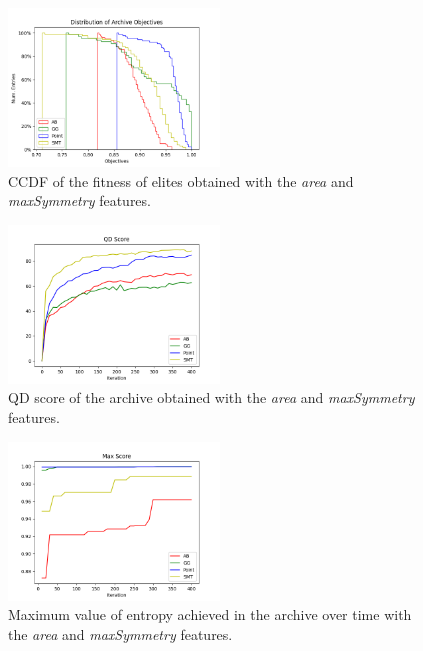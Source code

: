 \vspace*{\fill}
\begin{figure}[hbt!]
    \centering
    \includegraphics[width=0.5\textwidth]{images/Exp1/archive_ccdf.png}
    \caption{CCDF of the fitness of elites obtained with the \textit{area} and \textit{maxSymmetry} features.}
    \label{fig:ccdf_exp1}
\end{figure}


\begin{figure}[H]
    \centering
    \includegraphics[width=0.5\textwidth]{images/Exp1/qd_score.png}
    \caption{QD score of the archive obtained with the \textit{area} and \textit{maxSymmetry} features.}
    \label{fig:qd_score_exp1}
\end{figure}
\vspace*{\fill}


\begin{figure}[H]
    \centering
    \includegraphics[width=0.5\textwidth]{images/Exp1/max_score.png}
    \caption{Maximum value of entropy achieved in the archive over time with the \textit{area} and \textit{maxSymmetry} features.}
    \label{fig:max_score_exp1}
\end{figure}
\vspace*{\fill}


